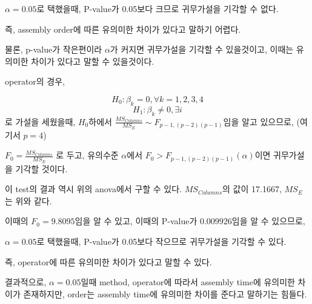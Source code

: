 \documentclass{article}
\begin{document}
$\alpha = 0.05$로 택했을때, P-value가 0.05보다 크므로 귀무가설을 기각할 수 없다.

즉, assembly order에 따른 유의미한 차이가 있다고 말하기 어렵다. 

물론, p-value가 작은편이라 $\alpha$가 커지면 귀무가설을 기각할 수 있을것이고, 이때는 유의미한 차이가 있다고 말할 수 있을것이다.

operator의 경우,

$$H_0 : \beta_k = 0 , \forall k = 1, 2, 3, 4$$ 
$$H_1 :  \beta_k \neq 0, \exists i$$
로 가설을 세웠을때, $H_0$하에서 $\frac{MS_{Columns}}{MS_E} \sim F_{p-1, (p-2)(p-1)} $임을 알고 있으므로,
(여기서 $p = 4$)

$F_0 = \frac{MS_{Columns}}{MS_E}$ 로 두고,  유의수준 $\alpha$에서 $F_0 > F_{p-1, (p-2)(p-1)}(\alpha)$이면 귀무가설을 기각할 것이다.
 
이 test의 결과 역시 위의 anova에서 구할 수 있다. $MS_{Columns}$의 값이 17.1667, $MS_E$는 위와 같다.

이때의 $F_0 = 9.8095$임을 알 수 있고, 이때의 P-value가 $0.009926$임을 알 수 있으므로,

$\alpha = 0.05$로 택했을때, P-value가 0.05보다 작으므로 귀무가설을 기각할 수 있다.

즉, operator에 따른 유의미한 차이가 있다고 말할 수 있다.


결과적으로,  $\alpha = 0.05$일때 method, operator에 따라서 assembly time에 유의미한 차이가 존재하지만, order는 assembly time에 유의미한 차이를 준다고 말하기는 힘들다.
\end{document}
